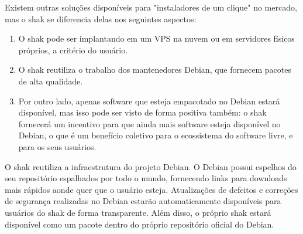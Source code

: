 \begin{anexosenv}
Existem outras soluções disponíveis para "instaladores de um clique" no
mercado, mas o shak se diferencia delas nos seguintes aspectos:

\begin{enumerate}
  \item O shak pode ser implantando em um VPS na nuvem ou em servidores físicos
  próprios, a critério do usuário.
  \item O shak reutiliza o trabalho dos mantenedores Debian, que fornecem pacotes
  de alta qualidade.
  \item Por outro lado, apenas software que esteja empacotado no Debian estará
  disponível, mas isso pode ser visto de forma positiva também: o shak
  fornecerá um incentivo para que ainda mais software esteja disponível no
  Debian, o que é um benefício coletivo para o ecossistema do software livre, e
  para os seus usuários.
\end{enumerate}

O shak reutiliza a infraestrutura do projeto Debian. O Debian possui espelhos 
do seu repositório espalhados por todo o mundo, fornecendo links para 
downloads mais rápidos aonde quer que o usuário esteja. Atualizações de 
defeitos e correções de segurança realizadas no Debian estarão automaticamente 
disponíveis para usuários do shak de forma transparente. Além disso, o 
próprio shak estará disponível como um pacote dentro do próprio repositório oficial do Debian.

\end{anexosenv}
